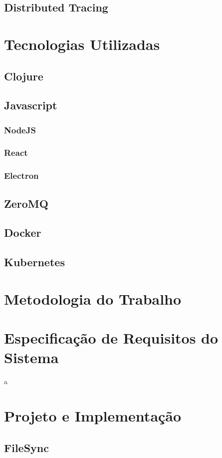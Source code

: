 \documentclass[]{politex}
\begin{document}
	
	\section{Distributed Tracing}
	
 
\chapter{Tecnologias Utilizadas}
	\section{Clojure}
	\section{Javascript}
	\subsection{NodeJS}
	\subsection{React}
	\subsection{Electron}
	\section{ZeroMQ}
	\section{Docker}
	\section{Kubernetes}
	

\chapter{Metodologia do Trabalho}

\chapter{Especificação de Requisitos do Sistema}
	a
	
\chapter{Projeto e Implementação}
	\section{FileSync}
\end{document}

